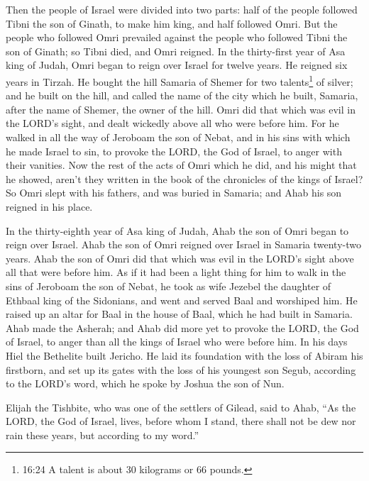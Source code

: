 \myverse{}Then the people of Israel were divided into two parts: half
of the people followed Tibni the son of Ginath, to make him king, and half followed Omri.
\myverse{}But the people who followed Omri prevailed against the people who followed
Tibni the son of Ginath; so Tibni died, and Omri reigned.
\myverse{}In the thirty-first year of Asa king of Judah, Omri began to reign over Israel
for twelve years. He reigned six years in Tirzah.
\myverse{}He bought the hill Samaria of Shemer for two talents\footnote{16:24 A talent is about 30 kilograms or 66 pounds.} of silver; and he built on the hill, and
called the name of the city which he built, Samaria, after the name of Shemer, the owner of the hill.
\myverse{}Omri did that which was evil in the LORD’s sight, and dealt wickedly above
all who were before him.
\myverse{}For he walked in all the way of Jeroboam the son of Nebat, and in his sins
with which he made Israel to sin, to provoke the LORD, the God of Israel, to anger with their vanities.
\myverse{}Now the rest of the acts of Omri which he did, and his might that he showed,
aren’t they written in the book of the chronicles of the kings of Israel?
\myverse{}So Omri slept with his fathers, and was buried in Samaria; and Ahab his son
reigned in his place.

\myverse{}In the thirty-eighth year of Asa king of Judah, Ahab the son
of Omri began to reign over Israel. Ahab the son of Omri reigned over Israel in Samaria twenty-two years.
\myverse{}Ahab the son of Omri did that which was evil in the LORD’s sight above all
that were before him.
\myverse{}As if it had been a light thing for him to walk in the sins of Jeroboam the
son of Nebat, he took as wife Jezebel the daughter of Ethbaal king of the Sidonians, and went and served
Baal and worshiped him.
\myverse{}He raised up an altar for Baal in the house of Baal, which he had built in
Samaria.
\myverse{}Ahab made the Asherah; and Ahab did more yet to provoke the LORD, the God
of Israel, to anger than all the kings of Israel who were before him.
\myverse{}In his days Hiel the Bethelite built Jericho. He laid its foundation with
the loss of Abiram his firstborn, and set up its gates with the loss of his youngest son Segub, according
to the LORD’s word, which he spoke by Joshua the son of Nun.


\mychapter{} \myverse*{}Elijah the Tishbite, who was one of the settlers of Gilead, said
to Ahab, “As the LORD, the God of Israel, lives, before whom I stand, there shall not be dew nor rain
these years, but according to my word.”

